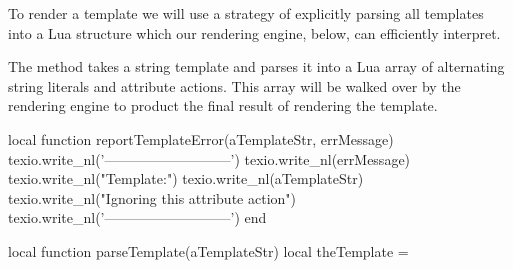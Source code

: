 To render a template we will use a strategy of explicitly parsing all 
templates into a Lua structure which our rendering engine, below, can 
efficiently interpret.

\startTestSuite[parseTemplate]

The  method takes a string template and parses it into 
a Lua array of alternating string literals and attribute actions. This 
array will be walked over by the  rendering engine to 
product the final result of rendering the template. 

\startLuaCode
local function reportTemplateError(aTemplateStr, errMessage)
  texio.write_nl('---------------------------')
  texio.write_nl(errMessage)
  texio.write_nl("Template:")
  texio.write_nl(aTemplateStr)
  texio.write_nl("Ignoring this attribute action")
  texio.write_nl('---------------------------')
end

local function parseTemplate(aTemplateStr)
  local theTemplate = { }

